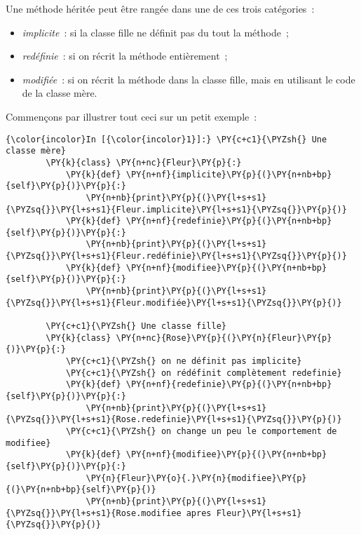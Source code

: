     Une méthode héritée peut être rangée dans une de ces trois catégories~:

\begin{itemize}
\tightlist
\item
  \emph{implicite}~: si la classe fille ne définit pas du tout la
  méthode~;
\item
  \emph{redéfinie}~: si on récrit la méthode entièrement~;
\item
  \emph{modifiée}~: si on récrit la méthode dans la classe fille, mais
  en utilisant le code de la classe mère.
\end{itemize}

    Commençons par illustrer tout ceci sur un petit exemple~:

    \begin{Verbatim}[commandchars=\\\{\},frame=single,framerule=0.3mm,rulecolor=\color{cellframecolor}]
{\color{incolor}In [{\color{incolor}1}]:} \PY{c+c1}{\PYZsh{} Une classe mère}
        \PY{k}{class} \PY{n+nc}{Fleur}\PY{p}{:}
            \PY{k}{def} \PY{n+nf}{implicite}\PY{p}{(}\PY{n+nb+bp}{self}\PY{p}{)}\PY{p}{:}
                \PY{n+nb}{print}\PY{p}{(}\PY{l+s+s1}{\PYZsq{}}\PY{l+s+s1}{Fleur.implicite}\PY{l+s+s1}{\PYZsq{}}\PY{p}{)}
            \PY{k}{def} \PY{n+nf}{redefinie}\PY{p}{(}\PY{n+nb+bp}{self}\PY{p}{)}\PY{p}{:}
                \PY{n+nb}{print}\PY{p}{(}\PY{l+s+s1}{\PYZsq{}}\PY{l+s+s1}{Fleur.redéfinie}\PY{l+s+s1}{\PYZsq{}}\PY{p}{)}
            \PY{k}{def} \PY{n+nf}{modifiee}\PY{p}{(}\PY{n+nb+bp}{self}\PY{p}{)}\PY{p}{:}
                \PY{n+nb}{print}\PY{p}{(}\PY{l+s+s1}{\PYZsq{}}\PY{l+s+s1}{Fleur.modifiée}\PY{l+s+s1}{\PYZsq{}}\PY{p}{)}
        
        \PY{c+c1}{\PYZsh{} Une classe fille}
        \PY{k}{class} \PY{n+nc}{Rose}\PY{p}{(}\PY{n}{Fleur}\PY{p}{)}\PY{p}{:}
            \PY{c+c1}{\PYZsh{} on ne définit pas implicite}
            \PY{c+c1}{\PYZsh{} on rédéfinit complètement redefinie}
            \PY{k}{def} \PY{n+nf}{redefinie}\PY{p}{(}\PY{n+nb+bp}{self}\PY{p}{)}\PY{p}{:}
                \PY{n+nb}{print}\PY{p}{(}\PY{l+s+s1}{\PYZsq{}}\PY{l+s+s1}{Rose.redefinie}\PY{l+s+s1}{\PYZsq{}}\PY{p}{)}
            \PY{c+c1}{\PYZsh{} on change un peu le comportement de modifiee}
            \PY{k}{def} \PY{n+nf}{modifiee}\PY{p}{(}\PY{n+nb+bp}{self}\PY{p}{)}\PY{p}{:}
                \PY{n}{Fleur}\PY{o}{.}\PY{n}{modifiee}\PY{p}{(}\PY{n+nb+bp}{self}\PY{p}{)}
                \PY{n+nb}{print}\PY{p}{(}\PY{l+s+s1}{\PYZsq{}}\PY{l+s+s1}{Rose.modifiee apres Fleur}\PY{l+s+s1}{\PYZsq{}}\PY{p}{)}
\end{Verbatim}


